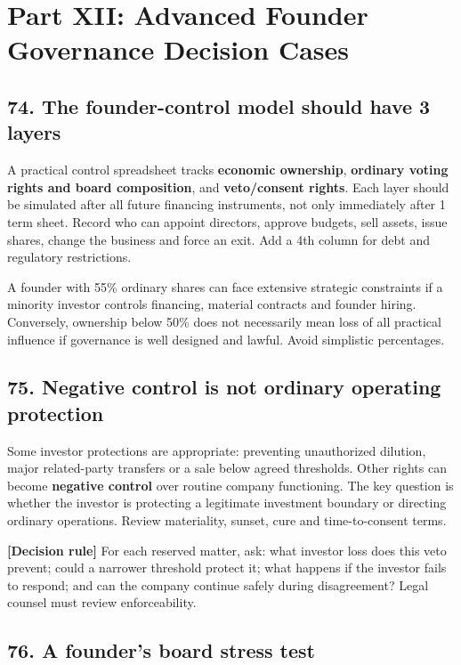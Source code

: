 \section*{Part XII: Advanced Founder Governance Decision Cases}

\subsection{74. The founder-control model should have 3 layers}

A practical control spreadsheet tracks \textbf{economic ownership}, \textbf{ordinary voting rights and board composition}, and \textbf{veto/consent rights}. Each layer should be simulated after all future financing instruments, not only immediately after 1 term sheet. Record who can appoint directors, approve budgets, sell assets, issue shares, change the business and force an exit. Add a 4th column for debt and regulatory restrictions.

A founder with 55\% ordinary shares can face extensive strategic constraints if a minority investor controls financing, material contracts and founder hiring. Conversely, ownership below 50\% does not necessarily mean loss of all practical influence if governance is well designed and lawful. Avoid simplistic percentages.

\subsection{75. Negative control is not ordinary operating protection}

Some investor protections are appropriate: preventing unauthorized dilution, major related-party transfers or a sale below agreed thresholds. Other rights can become \textbf{negative control} over routine company functioning. The key question is whether the investor is protecting a legitimate investment boundary or directing ordinary operations. Review materiality, sunset, cure and time-to-consent terms.

\textbf{[Decision rule]} For each reserved matter, ask: what investor loss does this veto prevent; could a narrower threshold protect it; what happens if the investor fails to respond; and can the company continue safely during disagreement? Legal counsel must review enforceability.

\subsection{76. A founder's board stress test}

